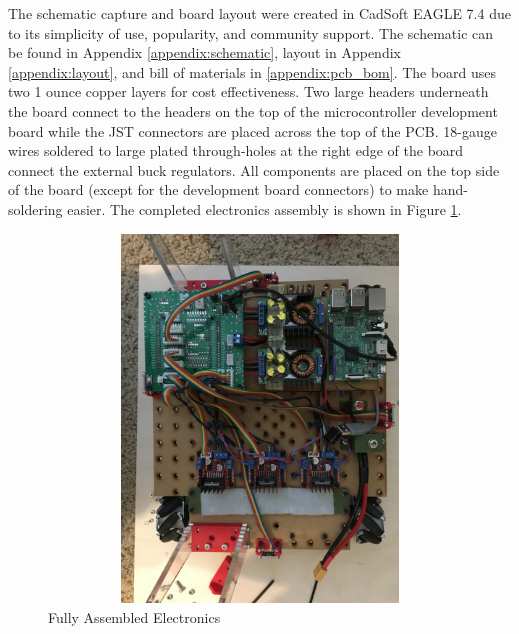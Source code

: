 The schematic capture and board layout were created in CadSoft EAGLE 7.4 due to its simplicity of use, popularity, and community support. The schematic can be found in Appendix \ref{appendix:schematic}, layout in Appendix \ref{appendix:layout}, and bill of materials in \ref{appendix:pcb_bom}. The board uses two  1 ounce copper layers for cost effectiveness. Two large headers underneath the board connect to the headers on the top of the microcontroller development board while the JST connectors are placed across the top of the PCB. 18-gauge wires soldered to large plated through-holes at the right edge of the board connect the external buck regulators. All components are placed on the top side of the board (except for the development board connectors) to make hand-soldering easier. The completed electronics assembly is shown in Figure \ref{fig:full_electronics}.

\begin{figure}[H]   %
	\centering \includegraphics[width=6in, height=3.85in, keepaspectratio]{figures/full_electronics.jpg}
	\caption{Fully Assembled Electronics}\label{fig:full_electronics}
\end{figure}

